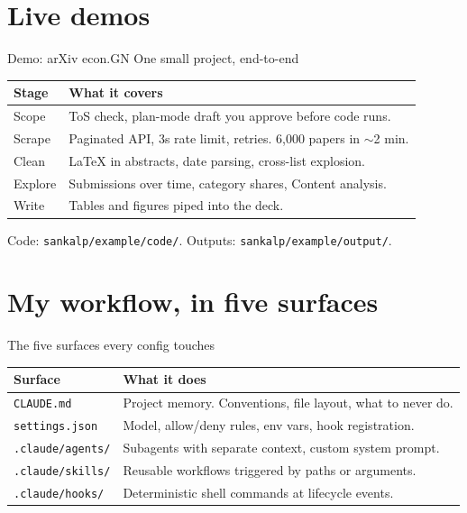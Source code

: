 \documentclass[9pt,aspectratio=169]{beamer}
\begin{document}
\section{Live demos}

\begin{frame}[fragile]{Demo: arXiv econ.GN}
  \vspace{0.2cm}
  One small project, end-to-end

  \vspace{0.5cm}
  \begin{tabular}{p{} p{}}
    \toprule
    \textbf{Stage} & \textbf{What it covers}\\
    \midrule
    Scope    & ToS check, plan-mode draft you approve before code runs.\\
    Scrape   & Paginated API, 3s rate limit, retries. 6{,}000 papers in $\sim$2 min.\\
    Clean    & LaTeX in abstracts, date parsing, cross-list explosion.\\
    Explore  & Submissions over time, category shares, Content analysis.\\
    Write    & Tables and figures piped into the deck.\\
    \bottomrule
  \end{tabular}
  \vspace{0.3cm}

  \footnotesize Code: \texttt{sankalp/example/code/}. Outputs: \texttt{sankalp/example/output/}.
\end{frame}


\section{My workflow, in five surfaces}

\begin{frame}[fragile]{The five surfaces every config touches}
  \begin{tabular}{p{} p{}}
    \toprule
    \textbf{Surface} & \textbf{What it does}\\
    \midrule
    \texttt{CLAUDE.md} & Project memory. Conventions, file layout, what to never do.\\
    \texttt{settings.json} & Model, allow/deny rules, env vars, hook registration.\\
    \texttt{.claude/agents/} & Subagents with separate context, custom system prompt.\\
    \texttt{.claude/skills/} & Reusable workflows triggered by paths or arguments.\\
    \texttt{.claude/hooks/} & Deterministic shell commands at lifecycle events.\\
    \bottomrule
  \end{tabular}
  \vspace{0.3cm}

\end{frame}
\end{document}
